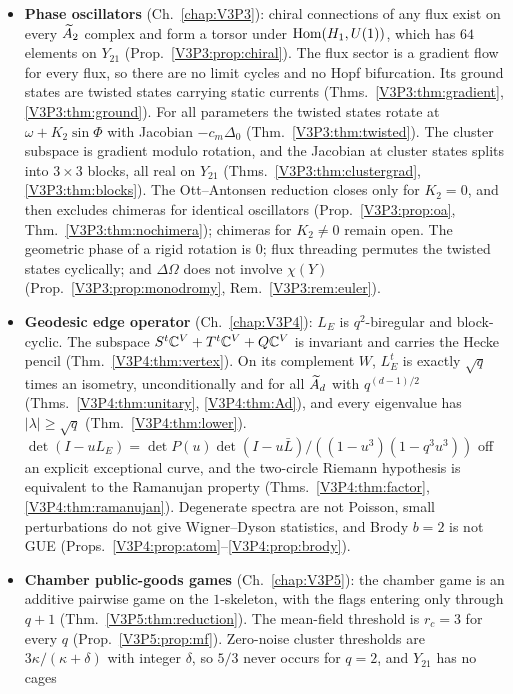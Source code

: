 \begin{itemize}
(Prop.~\ref{V3P2:prop:k777}).
\item \textbf{Phase oscillators} (Ch.~\ref{chap:V3P3}): chiral connections of any flux exist on
every $\widetilde A_2$ complex and form a torsor under $\operatorname{Hom}(H_1,U(1))$, which has $64$ elements on
$Y_{21}$ (Prop.~\ref{V3P3:prop:chiral}). The flux sector is a gradient flow for every flux, so
there are no limit cycles and no Hopf bifurcation. Its ground states are twisted states
carrying static currents (Thms.~\ref{V3P3:thm:gradient}, \ref{V3P3:thm:ground}). For all
parameters the twisted states rotate at $\omega+K_2\sin\Phi$ with Jacobian $-c_m\Delta_0$
(Thm.~\ref{V3P3:thm:twisted}). The cluster subspace is gradient modulo rotation, and the
Jacobian at cluster states splits into $3\times3$ blocks, all real on $Y_{21}$
(Thms.~\ref{V3P3:thm:clustergrad}, \ref{V3P3:thm:blocks}). The Ott--Antonsen reduction closes
only for $K_2=0$, and then excludes chimeras for identical oscillators
(Prop.~\ref{V3P3:prop:oa}, Thm.~\ref{V3P3:thm:nochimera}); chimeras for $K_2\ne0$ remain open.
The geometric phase of a rigid rotation is $0$; flux threading permutes the twisted states
cyclically; and $\Delta\Omega$ does not involve $\chi(Y)$ (Prop.~\ref{V3P3:prop:monodromy},
Rem.~\ref{V3P3:rem:euler}).
\item \textbf{Geodesic edge operator} (Ch.~\ref{chap:V3P4}): $L_E$ is $q^{2}$-biregular and
block-cyclic. The subspace $S^{t}\mathbb{C}^{V}+T^{t}\mathbb{C}^{V}+Q\mathbb{C}^{V}$ is invariant and carries the Hecke
pencil (Thm.~\ref{V3P4:thm:vertex}). On its complement $W$, $L_E^{t}$ is exactly $\sqrt q$
times an isometry, unconditionally and for all $\widetilde A_{d}$ with $q^{(d-1)/2}$
(Thms.~\ref{V3P4:thm:unitary}, \ref{V3P4:thm:Ad}), and every eigenvalue has
$|\lambda|\ge\sqrt q$ (Thm.~\ref{V3P4:thm:lower}). $\det(I-uL_E)=\det
P(u)\det(I-u\bar L)/((1-u^{3})(1-q^{3}u^{3}))$ off an explicit exceptional curve, and the
two-circle Riemann hypothesis is equivalent to the Ramanujan property
(Thms.~\ref{V3P4:thm:factor}, \ref{V3P4:thm:ramanujan}). Degenerate spectra are not Poisson,
small perturbations do not give Wigner--Dyson statistics, and Brody $b=2$ is not GUE
(Props.~\ref{V3P4:prop:atom}--\ref{V3P4:prop:brody}).
\item \textbf{Chamber public-goods games} (Ch.~\ref{chap:V3P5}): the chamber game is an
additive pairwise game on the $1$-skeleton, with the flags entering only through $q+1$
(Thm.~\ref{V3P5:thm:reduction}). The mean-field threshold is $r_c=3$ for every $q$
(Prop.~\ref{V3P5:prop:mf}). Zero-noise cluster thresholds are $3\kappa/(\kappa+\delta)$ with
integer $\delta$, so $5/3$ never occurs for $q=2$, and $Y_{21}$ has no cages

\end{itemize}
